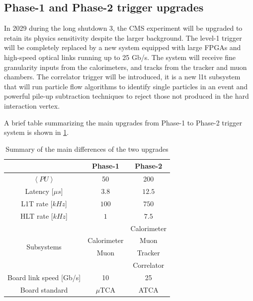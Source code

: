 \documentclass[../../main.tex]{subfiles}
\begin{document}
\subsection{Phase-1 and Phase-2 trigger upgrades}
\label{L1T_summary}

In 2029 during the long shutdown 3, the CMS experiment will be upgraded to retain its physics sensitivity despite the larger background. The level-1 trigger will be completely replaced by a new system equipped with large FPGAs and high-speed optical links running up to 25 Gb/s. The system will receive fine granularity inputs from the calorimeters, and tracks from the tracker and muon chambers. The correlator trigger will be introduced, it is a new \acrshort{l1t} subsystem that will run particle flow algorithms to identify single particles in an event and powerful pile-up subtraction techniques to reject those not produced in the hard interaction vertex.  

A brief table summarizing the main upgrades from Phase-1 to Phase-2 trigger system is shown in \ref{tab:L1T_summary}.


\begin{table}[h]
    \centering
    \begin{tabular}{|c|c|c|}
        \hline
        & Phase-1 & Phase-2 \\
        \hline
        $\left<PU\right>$            & 50    & 200    \\
        Latency [$\mu s$] & $3.8$ & $12.5$ \\
        L1T rate [$kHz$]  & $100$ & $750$  \\
        HLT rate [$kHz$]  & $1$   & $7.5$  \\
        \hline
        \multirow{4}{*}{Subsystems} &  & Calorimeter \\
                                    & Calorimeter & Muon \\
                                    & Muon & Tracker     \\
                                    & & Correlator \\
        \hline
        Board link speed [Gb/s] & 10 & 25 \\
        Board standard & $\mu$TCA  & ATCA \\
        
        
        \hline
    \end{tabular}
    \caption{Summary of the main differences of the two upgrades}
    \label{tab:L1T_summary}
\end{table}
\end{document}
